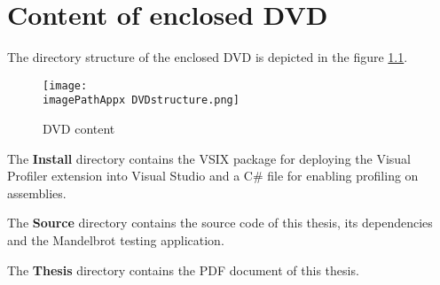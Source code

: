 \chapter{Content of enclosed DVD}
The directory structure of the enclosed DVD is depicted in the figure \ref{fig:12DVDStructure}.

\begin{figure}[H]
	\centering
		\texttt{[image: \\imagePathAppx DVDstructure.png]}
		\caption{DVD content}
	\label{fig:12DVDStructure}
\end{figure}

The \textbf{Install} directory contains the VSIX package for deploying the Visual Profiler extension into Visual Studio and a C\# file for enabling profiling on assemblies.

The \textbf{Source} directory contains the source code of this thesis, its dependencies and the Mandelbrot testing application.

The \textbf{Thesis} directory contains the PDF document of this thesis.
